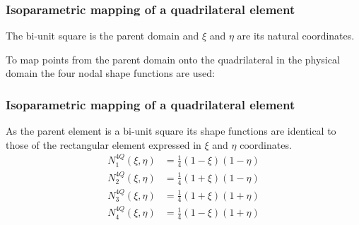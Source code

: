 \documentclass[notes]{beamer}
\begin{document}
\begin{frame}
\frametitle{Isoparametric mapping of a quadrilateral element}
The bi-unit square is the parent domain and $\xi$ and $\eta$ are its natural coordinates. 

To map points from the parent domain onto the quadrilateral in the physical domain the four nodal
shape functions are used:

\end{frame}

\begin{frame}
\frametitle{Isoparametric mapping of a quadrilateral element}
As the parent element is a bi-unit square its shape functions are identical to those of the
rectangular element expressed in $\xi$ and $\eta$ coordinates.
\begin{align*}
	N_1^{4Q}(\xi, \eta) & = \frac{1}{4}(1-\xi)(1-\eta)\\
	N_2^{4Q}(\xi, \eta) & = \frac{1}{4}(1+\xi)(1-\eta)\\
	N_3^{4Q}(\xi, \eta) & = \frac{1}{4}(1+\xi)(1+\eta)\\
	N_4^{4Q}(\xi, \eta) & = \frac{1}{4}(1-\xi)(1+\eta)\\
\end{align*}
\end{frame}
\end{document}
